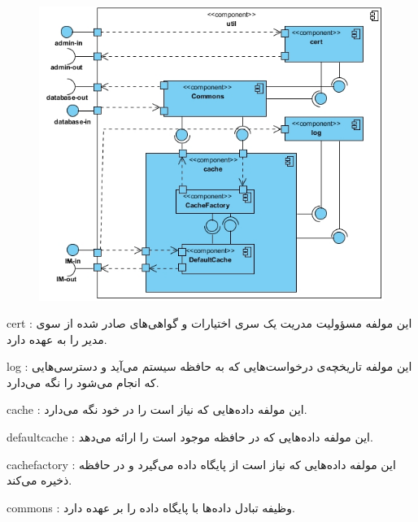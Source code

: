 \begin{figure}[H]
\centering
\includegraphics[scale=.5]{img/util.jpg}
\caption{}

\end{figure}


\begin{itemize}



 cert : این مولفه مسؤولیت مدریت یک سری اختیارات و گواهی‌های صادر شده از سوی مدیر را به عهده دارد.

 log :  این مولفه تاریخچه‌ی درخواست‌هایی که به حافظه سیستم می‌آید و دسترسی‌هایی که انجام می‌شود را نگه می‌دارد.

 cache : این مولفه داده‌هایی که نیاز است را در خود نگه می‌دارد.

 defaultcache : این مولفه داده‌هایی که در حافظه موجود است را ارائه می‌د‌هد.

 cachefactory : این مولفه داده‌هایی که نیاز است از پایگاه داده می‌گیرد و در حافظه ذخیره می‌کند.

 commons : وظیفه تبادل داده‌ها با پایگاه داده را بر عهده دارد.



\end{itemize}





